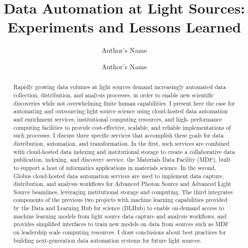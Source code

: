 \documentclass{aip-cp}
\newcommand\ian[1]{}
\newcommand\ryan[1]{}
\newcommand\ian[1]{{\color{red}[Ian: #1]}}
\newcommand\ryan[1]{{\color{green}[Ryan: #1]}}
\begin{document}
\title{Data Automation at Light Sources:\\Experiments and Lessons Learned\ian{more exciting title needed}}

\author[aff1,aff2]{Author's Name}
\author[aff2]{Author's Name}


\maketitle


\begin{abstract}
Rapidly growing data volumes at light sources demand increasingly automated data collection, 
distribution, and analysis processes, in order to enable new scientific discoveries while not 
overwhelming finite human capabilities. I present here the case for automating and outsourcing 
light source science using cloud-hosted data automation and enrichment services, institutional 
computing resources, and high- performance computing facilities to provide cost-effective, scalable, 
and reliable implementations of such processes. I discuss three specific services that accomplish 
these goals for data distribution, automation, and transformation. In the first, such services are 
combined with cloud-hosted data indexing and institutional storage to create a 
collaborative data publication, indexing, and discovery service, the Materials Data Facility (MDF), 
built to support a host of informatics applications in materials science. In the second,  
Globus cloud-hosted data automation services are used to implement data capture, distribution, and 
analysis workflows for Advanced Photon Source and Advanced Light Source beamlines, leveraging 
institutional storage and computing. The third integrates 
components of the previous two projects with machine learning capabilities provided by the Data and 
Learning Hub for science (DLHub) to enable on-demand access to machine learning models from light 
source data capture and analysis workflows, and provides simplified interfaces to train new models 
on data from sources such as MDF on leadership scale computing resources. I draw conclusions about 
best practices for building next-generation data automation systems for future light sources.
\ryan{Map this to the new structure.}
\end{abstract}
\end{document}

